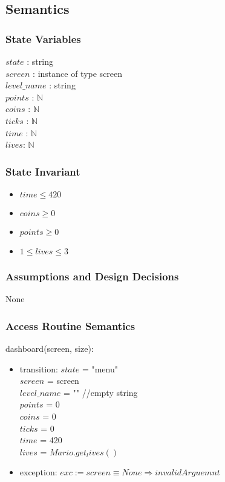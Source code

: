\documentclass[12pt]{article}
\begin{document}
\subsection {Semantics}

\subsubsection {State Variables}

$state$ : string \\
$screen$ : instance of type screen \\
$level\_name$ : string \\
$points$ : $\mathbb{N}$ \\
$coins$ : $\mathbb{N}$ \\
$ticks$ : $\mathbb{N}$ \\
$time$ : $\mathbb{N}$ \\
$lives$: $\mathbb{N}$


\subsubsection {State Invariant}
\begin{itemize}
    \item $time \leq 420$
    \item $coins \geq 0$
    \item $points \geq 0$
    \item $1 \leq lives \leq 3$
\end{itemize}

\subsubsection {Assumptions and Design Decisions}

None

\subsubsection {Access Routine Semantics}

\noindent dashboard(screen, size):
\begin{itemize}
    \item transition:
    $state$ = "menu" \\
    $screen$ = screen \\
    $level\_name$ = "" //empty string \\
    $points$ = 0 \\
    $coins$ = 0 \\
    $ticks$ = 0 \\
    $time$ = 420 \\
    $lives$ = $Mario.get_lives()$ \\
    \item exception: $exc := screen \equiv None \Rightarrow invalidArguemnt$
\end{itemize}
\end{document}
